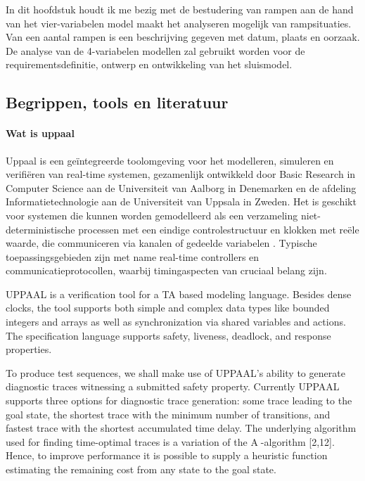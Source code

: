 \documentclass{article}
\begin{document}
	
	In dit hoofdstuk houdt ik me bezig met de bestudering van rampen aan de hand van het vier-variabelen model  maakt het analyseren mogelijk van rampsituaties. Van een aantal rampen is een beschrijving gegeven met datum, plaats en oorzaak. De analyse van de 4-variabelen modellen zal gebruikt worden voor de requirementsdefinitie, ontwerp en ontwikkeling van het sluismodel. 
	
	
	
	\subsection{Begrippen, tools en literatuur}
	
	\paragraph{Wat is uppaal}
	Uppaal is een geïntegreerde toolomgeving voor het modelleren, simuleren en verifiëren van real-time systemen, gezamenlijk ontwikkeld door Basic Research in Computer Science aan de Universiteit van Aalborg in Denemarken en de afdeling Informatietechnologie aan de Universiteit van Uppsala in Zweden. Het is geschikt voor systemen die kunnen worden gemodelleerd als een verzameling niet-deterministische processen met een eindige controlestructuur en klokken met reële waarde, die communiceren via kanalen of gedeelde variabelen . Typische toepassingsgebieden zijn met name real-time controllers en communicatieprotocollen, waarbij timingaspecten van cruciaal belang zijn. %
	
	UPPAAL is a verification tool for a TA based modeling language. Besides dense clocks,
	the tool supports both simple and complex data types like bounded integers and arrays
	as well as synchronization via shared variables and actions. The specification language
	supports safety, liveness, deadlock, and response properties.
	
	To produce test sequences, we shall make use of UPPAAL’s ability to generate diagnostic
	traces witnessing a submitted safety property. Currently UPPAAL supports three
	options for diagnostic trace generation: some trace leading to the goal state, the shortest
	trace with the minimum number of transitions, and fastest trace with the shortest
	accumulated time delay. The underlying algorithm used for finding time-optimal traces
	is a variation of the A-algorithm [2,12]. Hence, to improve performance it is possible
	to supply a heuristic function estimating the remaining cost from any state to the goal
	state.
	
\end{document}
